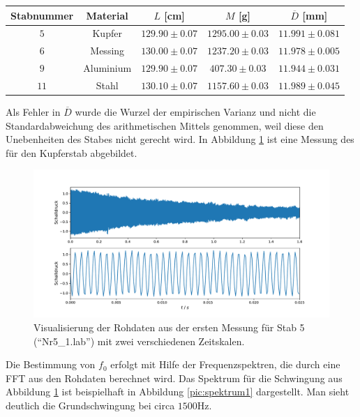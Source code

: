 \documentclass[a4paper, 12pt]{scrartcl}
\begin{document}
\begin{table}[H]
\centering
\begin{tabular}{cc|c|c|c}
Stabnummer & Material & $L$ [cm] & $M$ [g] & $\overline{D}$ [mm] \\
\hline
$5$ & Kupfer & $129.90\pm 0.07$ & $1295.00\pm 0.03$ & $11.991 \pm 0.081$ \\
$6$ & Messing & $130.00 \pm 0.07$ & $1237.20 \pm 0.03$ & $11.978 \pm 0.005$ \\
$9$ & Aluminium & $129.90 \pm 0.07$ & $407.30 \pm 0.03$ & $11.944 \pm 0.031$ \\
$11$ & Stahl & $130.10 \pm 0.07$ & $1157.60 \pm 0.03$ & $11.989 \pm 0.045$
\end{tabular}
\end{table}
Als Fehler in $\overline{D}$ wurde die Wurzel der empirischen Varianz und nicht die Standardabweichung des arithmetischen Mittels genommen, weil diese den Unebenheiten des Stabes nicht gerecht wird. In Abbildung \ref{pic:rohdaten} ist eine Messung des für den Kupferstab abgebildet.

\begin{figure}[h]
	\centering
	\includegraphics[width=\linewidth]{plots/rohdaten.pdf}
	\caption{Visualisierung der Rohdaten aus der ersten Messung für Stab 5 (\mbox{``Nr5\_1.lab''}) mit zwei verschiedenen Zeitskalen.}
	\label{pic:rohdaten}
\end{figure}

Die Bestimmung von $f_0$ erfolgt mit Hilfe der Frequenzspektren, die durch eine FFT aus den Rohdaten berechnet wird. Das Spektrum für die Schwingung aus Abbildung \ref{pic:rohdaten} ist beispielhaft in Abbildung \ref{pic:spektrum1} dargestellt. Man sieht deutlich die Grundschwingung bei circa $1500$Hz.
\end{document}
